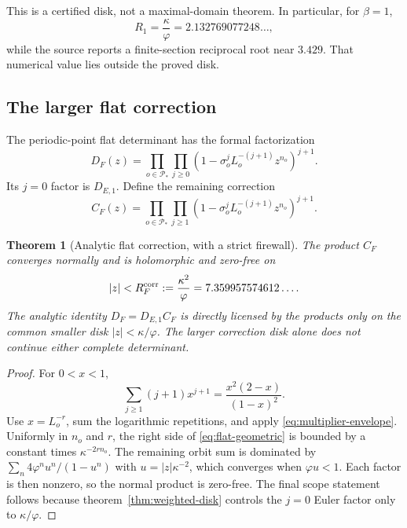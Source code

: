 \documentclass[11pt]{article}
\numberwithin{equation}{section}
\newtheorem{theorem}{Theorem}[section]
\theoremstyle{remark}
\newcommand{\cP}{\mathcal P}
\begin{document}
This is a certified disk, not a maximal-domain theorem.  In particular, for
\(\beta=1\),
\begin{equation}
 R_1=\frac{\kappa}{\varphi}=2.132769077248\ldots,
 \label{eq:euler-beta-one-radius}
\end{equation}
while the source reports a finite-section reciprocal root near
\(3.429\).  That numerical value lies outside the proved disk.

\subsection{The larger flat correction}

The periodic-point flat determinant has the formal factorization
\begin{equation}
 D_F(z)=\prod_{o\in\cP_*}\prod_{j\ge0}
 \left(1-\sigma_o^jL_o^{-(j+1)}z^{n_o}\right)^{j+1}.
 \label{eq:flat-factorization}
\end{equation}
Its \(j=0\) factor is \(D_{E,1}\).  Define the remaining correction
\begin{equation}
 C_F(z)=\prod_{o\in\cP_*}\prod_{j\ge1}
 \left(1-\sigma_o^jL_o^{-(j+1)}z^{n_o}\right)^{j+1}.
 \label{eq:flat-correction}
\end{equation}

\begin{theorem}[Analytic flat correction, with a strict firewall]
\label{thm:flat-correction}
The product \(C_F\) converges normally and is holomorphic and zero-free on
\begin{equation}
 |z|<R_F^{\rm corr}:=\frac{\kappa^2}{\varphi}
 =7.359957574612\ldots.
 \label{eq:flat-correction-radius}
\end{equation}
The analytic identity
\(
D_F=D_{E,1}C_F
\)
is directly licensed by the products only on the common smaller disk
\(|z|<\kappa/\varphi\).  The larger correction disk alone does not continue
either complete determinant.
\end{theorem}

\begin{proof}
For \(0<x<1\),
\begin{equation}
 \sum_{j\ge1}(j+1)x^{j+1}
 =\frac{x^2(2-x)}{(1-x)^2}.
 \label{eq:flat-geometric}
\end{equation}
Use \(x=L_o^{-r}\), sum the logarithmic repetitions, and apply
\eqref{eq:multiplier-envelope}.  Uniformly in \(n_o\) and \(r\), the
right side of \eqref{eq:flat-geometric} is bounded by a constant times
\(\kappa^{-2rn_o}\).  The remaining orbit sum is dominated by
\(
\sum_n4\varphi^n u^n/(1-u^n)
\)
with \(u=|z|\kappa^{-2}\), which converges when \(\varphi u<1\).
Each factor is then nonzero, so the normal product is zero-free.  The final
scope statement follows because theorem~\ref{thm:weighted-disk} controls the
\(j=0\) Euler factor only to \(\kappa/\varphi\).
\end{proof}
\end{document}
